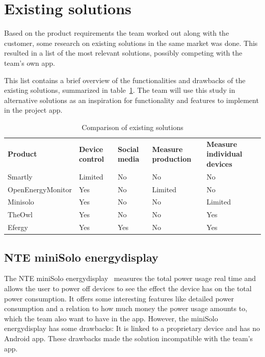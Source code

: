 \section{Existing solutions}
\label{sec:altsolution}
Based on the product requirements the team worked out along with the customer, some research on existing solutions in the same market was done. This resulted in a list of the most relevant solutions, possibly competing with the team's own app.
 
This list contains a brief overview of the functionalities and drawbacks of the existing solutions, summarized in table~\ref{tab:existingSolutions}. The team will use this study in alternative solutions as an inspiration for functionality and features to implement in the project app.


\begin{table}[H]
\centering
{}
\begin{tabular}{|l|l|p{2.6cm}|p{2.3cm}|p{2.2cm}|}
\hline
\textbf{Product} & \textbf{Device control} & \textbf{Social media} & \textbf{Measure production} & \textbf{Measure individual devices} \\
Smartly & Limited & No  & No & No\\
OpenEnergyMonitor & Yes & No  & Limited & No \\
Minisolo & Yes & No  & No & Limited\\
TheOwl & Yes & No & No & Yes\\
Efergy & Yes & Yes &  No & Yes\\\hline
\end{tabular}
\caption{Comparison of existing solutions}
\label{tab:existingSolutions}
\end{table}


\subsection{NTE miniSolo energydisplay}

The NTE miniSolo energydisplay~\cite{nte} measures the total power usage real time and allows the user to power off devices to see the effect the device has on the total power consumption. It offers some interesting features like detailed power consumption and a relation to how much money the power usage amounts to, which the team also want to have in the app. However, the miniSolo energydisplay has some drawbacks: It is linked to a proprietary device and has no Android app. These drawbacks made the solution incompatible with the team's app.


